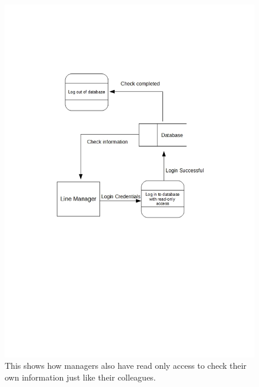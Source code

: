 \begin{figure}[H]
\includegraphics[width=\textwidth]{DFDLoginManager.jpg}
\caption{This shows how managers also have read only access to check their own information just like their colleagues.} \label{Page1Interview}
\end{figure}

